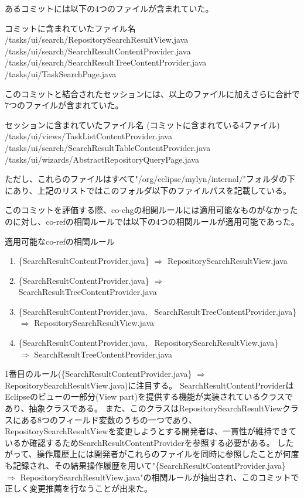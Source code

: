 \documentclass[a4paper]{jsbook}
\begin{document}
あるコミットには以下の4つのファイルが含まれていた。
\begin{itembox}{コミットに含まれていたファイル名}
  /tasks/ui/search/RepositorySearchResultView.java \\
  /tasks/ui/search/SearchResultContentProvider.java \\
  /tasks/ui/search/SearchResultTreeContentProvider.java \\
  /tasks/ui/TaskSearchPage.java
\end{itembox}
このコミットと結合されたセッションには、以上のファイルに加えさらに合計で7つのファイルが含まれていた。
\begin{itembox}{セッションに含まれていたファイル名}
  (コミットに含まれている4ファイル)\\
  /tasks/ui/views/TaskListContentProvider.java \\
  /tasks/ui/search/SearchResultTableContentProvider.java\\
  /tasks/ui/wizards/AbstractRepositoryQueryPage.java
\end{itembox}
ただし、これらのファイルはすべて"/org/eclipse/mylyn/internal/"フォルダの下にあり、上記のリストではこのフォルダ以下のファイルパスを記載している。

このコミットを評価する際、co-chgの相関ルールには適用可能なものがなかったのに対し、co-refの相関ルールでは以下の4つの相関ルールが適用可能であった。
\begin{itembox}{適用可能なco-refの相関ルール}
  \begin{enumerate}
    \item  \{SearchResultContentProvider.java\} $\Rightarrow$ RepositorySearchResultView.java
    \item \{SearchResultContentProvider.java\} $\Rightarrow$ SearchResultTreeContentProvider.java
    \item \{SearchResultContentProvider.java, ~SearchResultTreeContentProvider.java\} 
      \\$\Rightarrow$ RepositorySearchResultView.java
    \item \{SearchResultContentProvider.java, ~RepositorySearchResultView.java\} \\
  $\Rightarrow$ SearchResultTreeContentProvider.java
  \end{enumerate}
\end{itembox}

1番目のルール(\{SearchResultContentProvider.java\} $\Rightarrow$ RepositorySearchResultView.java)に注目する。
SearchResultContentProviderはEclipseのビューの一部分(View part)を提供する機能が実装されているクラスであり、抽象クラスである。
また、このクラスはRepositorySearchResultViewクラスにある8つのフィールド変数のうちの一つであり、
RepositorySearchResultViewを変更しようとする開発者は、一貫性が維持できているか確認するためSearchResultContentProviderを参照する必要がある。
したがって、操作履歴上には開発者がこれらのファイルを同時に参照したことが何度も記録され、その結果操作履歴を用いて"\{SearchResultContentProvider.java\} $\Rightarrow$ RepositorySearchResultView.java"の相関ルールが抽出され、このコミットで正しく変更推薦を行なうことが出来た。
\end{document}
